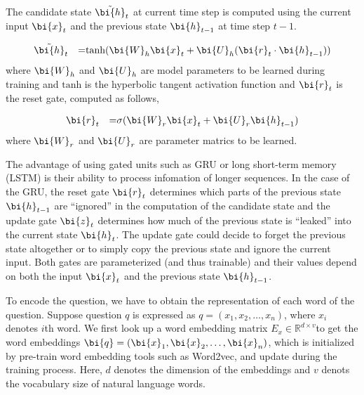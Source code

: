 The candidate state $\tilde{\bi{h}}_t$ at current time step is computed using the current input $\bi{x}_t$ and the previous state $\bi{h}_{t-1}$ at time step $t-1$.

\begin{equation}
\label{eqn:gru4}
\begin{aligned}
& \tilde{\bi{h}}_t & = &\mbox{tanh}(\bi{W}_h\bi{x}_t+\bi{U}_h(\bi{r}_t\cdot\bi{h}_{t-1}))\\
\end{aligned}
\end{equation}
\noindent
where $\bi{W}_h$ and $\bi{U}_h$ are model parameters to be learned during training and $\mbox{tanh}$ is the hyperbolic tangent activation function and $\bi{r}_t$ is the reset gate, computed as follows,

\begin{equation}
\label{eqn:gru5}
\begin{aligned}
& \bi{r}_t & = & \sigma(\bi{W}_r\bi{x}_t+\bi{U}_r\bi{h}_{t-1})\\
\end{aligned}
\end{equation}
\noindent
where $\bi{W}_r$ and $\bi{U}_r$ are parameter matrics to be learned.

The advantage of using gated units such as GRU or long short-term memory (LSTM) is their ability to process infomation of longer sequences. In the case of the GRU, the reset gate $\bi{r}_t$ determines which parts of the previous state $\bi{h}_{t-1}$ are ``ignored'' in the computation of the candidate state and the update gate $\bi{z}_t$ determines how much of the previous state is ``leaked'' into the current state $\bi{h}_t$. The update gate could decide to forget the previous state altogether or to simply copy the previous state and ignore the current input. Both gates are parameterized (and thus trainable) and their values depend on both the input $\bi{x}_t$ and the previous state $\bi{h}_{t-1}$.

To encode the question, we have to obtain the representation of each word of the question. Suppose question $q$ is expressed as $q=(x_1, x_2, \dots, x_n)$, where $x_i$ denotes $i$th word. We first look up a word embedding matrix $E_x\in \mathbb{R}^{d\times v}$to get the word embeddings $\bi{q}=(\bi{x}_1, \bi{x}_2, \dots, \bi{x}_n)$, which is initialized by pre-train word embedding tools such as Word2vec, and update during the training process. Here, $d$ denotes the dimension of the embeddings and $v$ denots the vocabulary size of natural language words.

